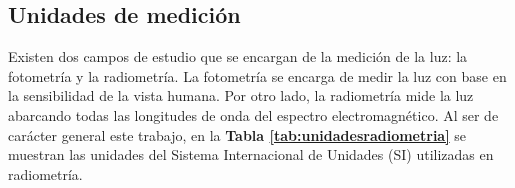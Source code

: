 \subsection{Unidades de medición}

Existen dos campos de estudio que se encargan de la medición de la luz: la fotometría y la radiometría. La fotometría se encarga de medir la luz con base en la sensibilidad de la vista humana. Por otro lado, la radiometría mide la luz abarcando todas las longitudes de onda del espectro electromagnético. Al ser de carácter general este trabajo, en la \textbf{Tabla \ref{tab:unidadesradiometria}} se muestran las unidades del Sistema Internacional de Unidades (SI) utilizadas en radiometría. 

\begin{table}[]
\centering
\caption{Unidades del SI utilizadas en radiometría}
\label{tab:unidadesradiometria}
\end{table}
